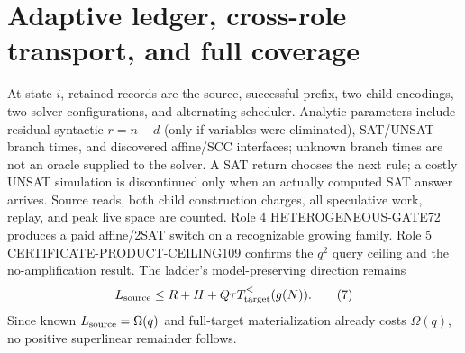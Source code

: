 \documentclass[11pt]{article}
\begin{document}
\section{Adaptive ledger, cross-role transport, and full coverage}
At state $i$, retained records are the source, successful prefix, two child encodings, two solver configurations, and alternating scheduler. Analytic parameters include residual syntactic $r=n-d$ (only if variables were eliminated), SAT/UNSAT branch times, and discovered affine/SCC interfaces; unknown branch times are not an oracle supplied to the solver. A SAT return chooses the next rule; a costly UNSAT simulation is discontinued only when an actually computed SAT answer arrives. Source reads, both child construction charges, all speculative work, replay, and peak live space are counted. Role 4 HETEROGENEOUS-GATE72 produces a paid affine/2SAT switch on a recognizable growing family. Role 5 CERTIFICATE-PRODUCT-CEILING109 confirms the $q^2$ query ceiling and the no-amplification result. The ladder's model-preserving direction remains
\[
L_{\rm source}\le R+H+Q\tau T_{\rm target}^{\le}(g(N)).
\tag{7}
\]
Since known $L_{\rm source}=\Omega(q)$ and full-target materialization already costs $\Omega(q)$, no positive superlinear remainder follows.
\small
\end{document}
